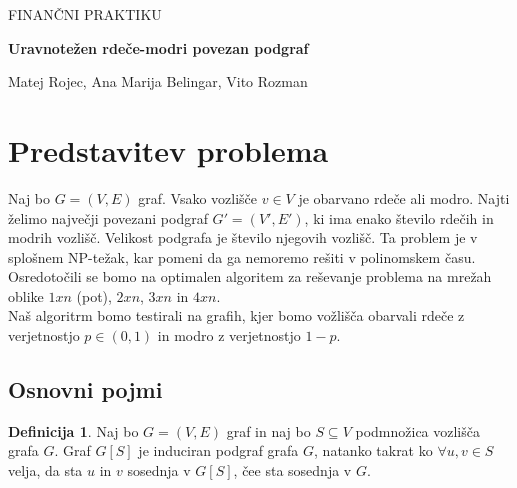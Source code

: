 \documentclass[a4paper, 11pt]{article}
\theoremstyle{definition}
\newtheorem{definicija}{Definicija}
\begin{document}
    \begin{titlepage}
        \begin{center}
            \vspace*{1cm}
            
            \LARGE
            FINANČNI PRAKTIKU
                
            \vspace{1cm}
            \huge
            \textbf{Uravnotežen rdeče-modri povezan podgraf}
                
            \vspace{1cm}
                
            \Large   
            Matej Rojec, Ana Marija Belingar, Vito Rozman 
        
            
            \vspace{2cm}
    
                
                    
        \end{center}
    \end{titlepage}

    \section{Predstavitev problema}

    Naj bo $G = (V, E)$ graf. Vsako vozlišče $v \in V $ je obarvano rdeče ali modro. 
    Najti želimo največji povezani podgraf $G' = (V', E')$, ki ima enako število rdečih in modrih vozlišč.
    Velikost podgrafa je število njegovih vozlišč. Ta problem je v splošnem NP-težak, kar pomeni da ga nemoremo
    rešiti v polinomskem času.\\
    Osredotočili se bomo na optimalen algoritem za reševanje problema na mrežah oblike $1xn$ (pot), $2xn$, 
    $3xn$ in $4xn$.\\
    Naš algoritrm bomo testirali na grafih, kjer bomo vožlišča obarvali rdeče z verjetnostjo $p \in (0,1)$ 
    in modro z verjetnostjo $1 - p$. 
    
    \subsection{Osnovni pojmi}
    
    \begin{definicija}
        Naj bo $G=(V,E)$ graf in naj bo $S \subseteq V$ podmnožica vozlišča grafa $G$. 
        Graf $G[S]$ je induciran podgraf grafa $G$, natanko takrat ko $\forall u, v \in S$ velja,
        da sta $u$ in $v$ sosednja v $G[S]$, čee sta sosednja v $G$.
    \end{definicija}
\end{document}
